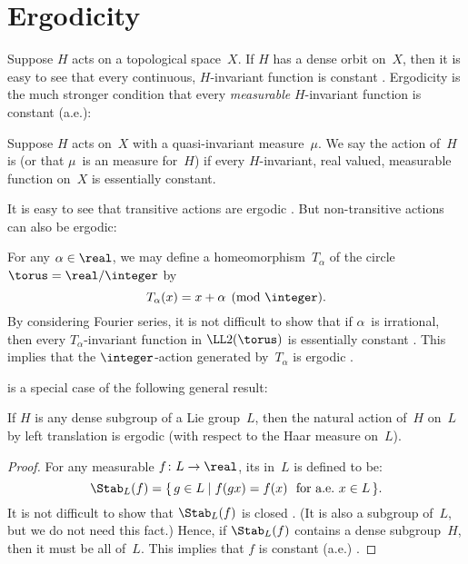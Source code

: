\section{Ergodicity} \label{ErgodicitySect}

Suppose $H$ acts on a topological space~$X$. If $H$ has a dense orbit on~$X$, then it is easy to see that every continuous, $H$-invariant function is constant . Ergodicity is the much stronger condition that every \emph{measurable} $H$-invariant function is constant (a.e.):

\begin{defn} \label{ErgodicDefn}
Suppose $H$ acts on~$X$ with a quasi-invariant measure~$\mu$.
We say the action of~$H$ is  (or that $\mu$~is an  measure for~$H$) if every $H$-invariant, real valued, measurable function on~$X$ is essentially constant.
\end{defn}

It is easy to see that transitive actions are ergodic . But non-transitive actions can also be ergodic:

\begin{eg} \label{IrratRotErg}
For any $\alpha \in \real$, we may define a homeomorphism~$T_\alpha$ of the circle $\torus = \real/\integer$ by
	$$ T_\alpha(x) = x + \alpha \pmod{\integer} .$$
By considering Fourier series, it is not difficult to show that if $\alpha$~is irrational, then every $T_\alpha$-invariant function in $\LL2(\torus)$ is essentially constant . This implies that the $\integer$-action generated by~$T_\alpha$ is ergodic .
\end{eg}

  is a special case of the following general result:

\begin{prop} \label{Dense->Erg}
If $H$ is any dense subgroup of a Lie group~$L$, then the natural action of~$H$ on~$L$ by left translation is ergodic\/ \textup(with respect to the Haar measure on~$L$\textup).
\end{prop}

\begin{proof}
For any measurable $f \colon L \to \real$, its  in~$L$ is defined to be:
	$$ \Stab_L(f) = \{\, g \in L \mid \text{$f(gx) = f(x)$ \ for a.e.\ $x \in L$} \,\} .$$
It is not difficult to show that $\Stab_L(f)$ is closed .
(It is also a subgroup of~$L$, but we do not need this fact.)  Hence, if $\Stab_L(f)$ contains a dense subgroup~$H$, then it must be all of~$L$. This implies that $f$ is constant (a.e.) .
\end{proof}

